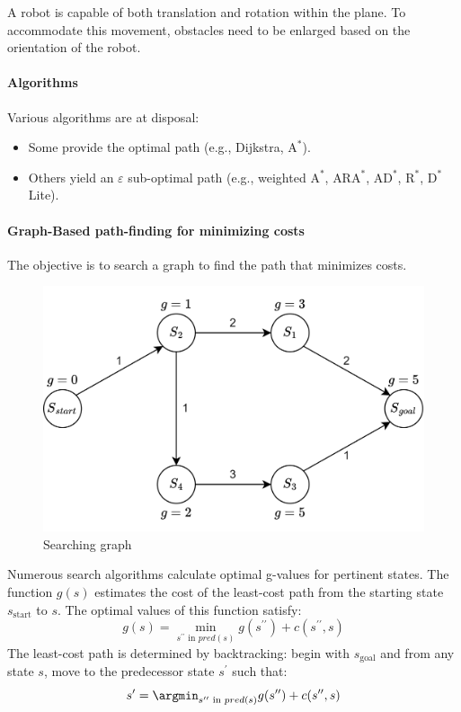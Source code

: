 A robot is capable of both translation and rotation within the plane. 
To accommodate this movement, obstacles need to be enlarged based on the orientation of the robot.

\paragraph*{Algorithms}
Various algorithms are at disposal:
\begin{itemize}
    \item Some provide the optimal path (e.g., Dijkstra, $\text{A}^\ast$).
    \item Others yield an $\varepsilon$ sub-optimal path (e.g., weighted $\text{A}^\ast$, $\text{ARA}^\ast$, $\text{AD}^\ast$, $\text{R}^\ast$, $\text{D}^\ast$ Lite).
\end{itemize}


\paragraph*{Graph-Based path-finding for minimizing costs}
The objective is to search a graph to find the path that minimizes costs.
\begin{figure}[H]
    \centering
    \includegraphics[width=0.5\linewidth]{images/sg.png}
    \caption{Searching graph}
\end{figure}
Numerous search algorithms calculate optimal g-values for pertinent states. 
The function $g(s)$ estimates the cost of the least-cost path from the starting state $s_{\text{start}}$ to $s$. 
The optimal values of this function satisfy:
\[g(s)=\min_{s^{\prime\prime} \text{ in }pred(s)}g(s^{\prime\prime})+c(s^{\prime\prime},s)\]
The least-cost path is determined by backtracking: begin with $s_{\text{goal}}$ and from any state $s$, move to the predecessor state $s^\prime$ such that:
\[s^\prime=\argmin_{s^{\prime\prime} \text{ in }pred(s)}g(s^{\prime\prime})+c(s^{\prime\prime},s)\]

